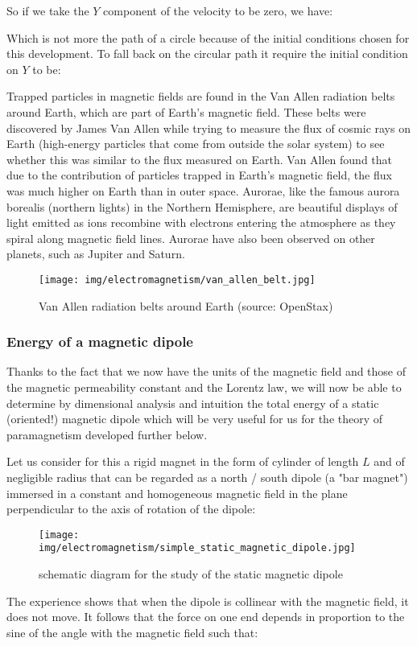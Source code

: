 	So if we take the $Y$ component of the velocity to be zero, we have:
	
	Which is not more the path of a circle because of the initial conditions chosen for this development. To fall back on the circular path it require the initial condition on $Y$ to be:
	
	Trapped particles in magnetic fields are found in the Van Allen radiation belts around Earth, which are part of Earth's magnetic field. These belts were discovered by James Van Allen while trying to measure the flux of cosmic rays on Earth (high-energy particles that come from outside the solar system) to see whether this was similar to the flux measured on Earth. Van Allen found that due to the contribution of particles trapped in Earth's magnetic field, the flux was much higher on Earth than in outer space. Aurorae, like the famous aurora borealis (northern lights) in the Northern Hemisphere, are beautiful displays of light emitted as ions recombine with electrons entering the atmosphere as they spiral along magnetic field lines. Aurorae have also been observed on other planets, such as Jupiter and Saturn.
	\begin{figure}[H]
		\centering
		\texttt{[image: img/electromagnetism/van\_allen\_belt.jpg]}
		\caption[Van Allen radiation belts around Earth]{Van Allen radiation belts around Earth (source: OpenStax)}
	\end{figure}
	
	\pagebreak
	\subsubsection{Energy of a magnetic dipole}
	Thanks to the fact that we now have the units of the magnetic field and those of the magnetic permeability constant and the Lorentz law, we will now be able to determine by dimensional analysis and intuition the total energy of a static (oriented!) magnetic dipole which will be very useful for us for the theory of paramagnetism developed further below.

	Let us consider for this a rigid magnet in the form of cylinder of length $L$ and of negligible radius that can be regarded as a north / south dipole (a "bar magnet") immersed in a constant and homogeneous magnetic field in the plane perpendicular to the axis of rotation of the dipole:
	\begin{figure}[H]
		\centering
		\texttt{[image: img/electromagnetism/simple\_static\_magnetic\_dipole.jpg]}
		\caption[]{schematic diagram for the study of the static magnetic dipole}
	\end{figure}
	The experience shows that when the dipole is collinear with the magnetic field, it does not move. It follows that the force on one end depends in proportion to the sine of the angle with the magnetic field such that:
	
